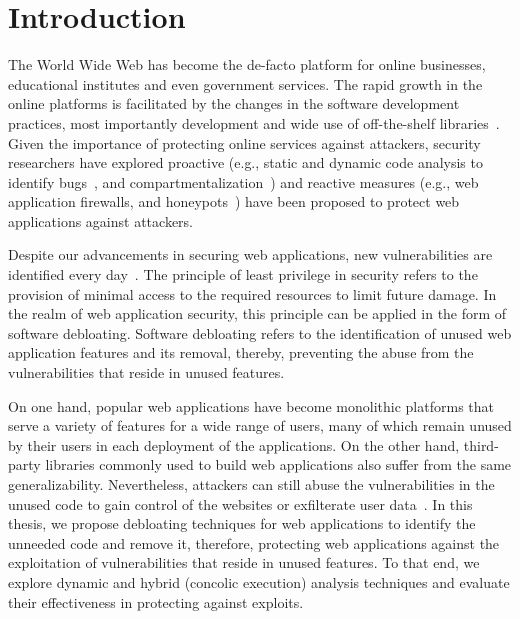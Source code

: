 \chapter{Introduction}

The World Wide Web has become the de-facto platform for online businesses, educational institutes and even government services. 
The rapid growth in the online platforms is facilitated by the changes in the software development practices, most importantly development and wide use of off-the-shelf libraries~\cite{packagiststats, npmstatistics, pypi}. 
Given the importance of protecting online services against attackers, security researchers have explored proactive (e.g., static and dynamic code analysis to identify bugs~\cite{jovanovic2006pixy, dahse2010rips, alhuzali2018navex}, and 
compartmentalization~\cite{vasilakis2018breakapp}) and reactive measures (e.g., web application firewalls, and honeypots~\cite{makiou2014improving, barron2021click}) have been proposed to protect web applications against attackers. 

Despite our advancements in securing web applications, new vulnerabilities are identified every day~\cite{cvedetails}. 
The principle of least privilege in security refers to the provision of minimal access to the required resources to limit future damage. 
In the realm of web application security, this principle can be applied in the form of software debloating. 
Software debloating refers to the identification of unused web application features and its removal, thereby, preventing the abuse from the vulnerabilities that reside in unused features. 

On one hand, popular web applications have become monolithic platforms that serve a variety of features for a wide range of users, many of which remain unused by their users in each deployment of the applications. 
On the other hand, third-party libraries commonly used to build web applications also suffer from the same generalizability. 
Nevertheless, attackers can still abuse the vulnerabilities in the unused code to gain control of the websites or exfilterate user data~\cite{drupalVulenrability, zendVulnerability, phpunitVulnerability, PHPGGC}. 
In this thesis, we propose debloating techniques for web applications to identify the unneeded code and remove it, therefore, protecting web applications against the exploitation of vulnerabilities that reside in unused features. 
To that end, we explore dynamic and hybrid (concolic execution) analysis techniques and evaluate their effectiveness in protecting against exploits. 




